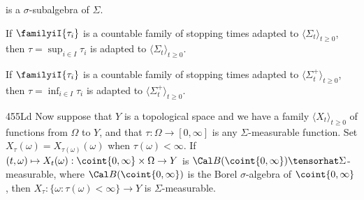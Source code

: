 
\noindent is a $\sigma$-subalgebra of $\Sigma$.   

\medskip

 If $\familyiI{\tau_i}$ is a countable
family of stopping times adapted to $\langle\Sigma_t\rangle_{t\ge 0}$,
then $\tau=\sup_{i\in I}\tau_i$ is adapted to
$\langle\Sigma_t\rangle_{t\ge 0}$.   

\medskip

 If $\familyiI{\tau_i}$ is a countable family of stopping
times adapted to $\langle\Sigma^+_t\rangle_{t\ge 0}$,
then $\tau=\inf_{i\in I}\tau_i$ is adapted to
$\langle\Sigma^+_t\rangle_{t\ge 0}$.

\spheader 455Ld Now suppose that $Y$ is a topological space and
we have a family
$\langle X_t\rangle_{t\ge 0}$ of functions from $\Omega$ to $Y$, and that
$\tau:\Omega\to[0,\infty]$ is any $\Sigma$-measurable function.
Set $X_{\tau}(\omega)=X_{\tau(\omega)}(\omega)$ when $\tau(\omega)<\infty$.
If $(t,\omega)\mapsto X_t(\omega):\coint{0,\infty}\times\Omega\to Y$
is $\Cal B(\coint{0,\infty})\tensorhat\Sigma$-measurable, where
$\Cal B(\coint{0,\infty})$ is the Borel $\sigma$-algebra of
$\coint{0,\infty}$, then $X_{\tau}:\{\omega:\tau(\omega)<\infty\}\to Y$
is $\Sigma$-measurable.   

